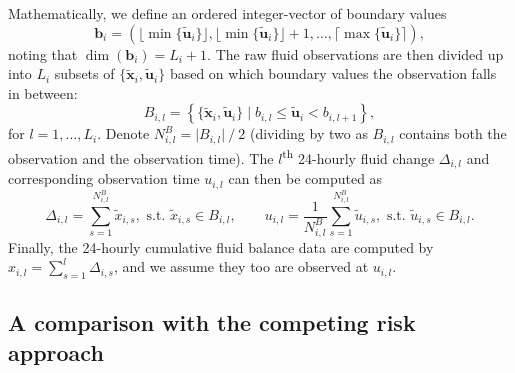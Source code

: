 \documentclass[
  10pt,
  a4paper,
]{article}
\begin{document}
Mathematically, we define an ordered integer-vector of boundary values
\begin{equation}
  \boldsymbol{b}_{i} = (\lfloor \min\{\tilde{\boldsymbol{u}}_{i}\} \rfloor,  \lfloor \min\{\tilde{\boldsymbol{u}}_{i}\} \rfloor + 1, \ldots, \lceil \max\{\tilde{\boldsymbol{u}}_{i}\} \rceil),
\end{equation} noting that \(\dim(\boldsymbol{b}_{i}) = L_{i} + 1\). The
raw fluid observations are then divided up into \(L_{i}\) subsets of
\(\{\tilde{\boldsymbol{x}}_{i}, \tilde{\boldsymbol{u}}_{i}\}\) based on
which boundary values the observation falls in between: \begin{equation}
  B_{i, l} = \left\{
    \{\tilde{\boldsymbol{x}}_{i}, \tilde{\boldsymbol{u}}_{i}\}
    \mid
    b_{i, l} \leq \tilde{\boldsymbol{u}}_{i} < b_{i, l + 1}
  \right\},
\end{equation} for \(l = 1, \ldots, L_{i}\). Denote
\(N^{B}_{i, l} = \lvert B_{i, l} \rvert \mathop{/} 2\) (dividing by two
as \(B_{i, l}\) contains both the observation and the observation time).
The \(l\)\textsuperscript{th} 24-hourly fluid change \(\Delta_{i, l}\)
and corresponding observation time \(u_{i, l}\) can then be computed as
\begin{equation}
  \Delta_{i, l} = \sum_{s = 1}^{N^{B}_{i, l}} \tilde{x}_{i, s}, \,\, \text{s.t.} \,\, \tilde{x}_{i, s} \in B_{i, l}, \qquad
  u_{i, l} = \frac{1}{N^{B}_{i, l}} \sum_{s = 1}^{N^{B}_{i, l}} \tilde{u}_{i, s}, \,\, \text{s.t.} \,\, \tilde{u}_{i, s} \in B_{i, l}.
\end{equation} Finally, the 24-hourly cumulative fluid balance data are
computed by \(x_{i, l} = \sum_{s = 1}^{l} \Delta_{i, s}\), and we assume
they too are observed at \(u_{i, l}\).

\hypertarget{a-comparison-with-the-competing-risk-approach}{%
\subsection{A comparison with the competing risk
approach}\label{a-comparison-with-the-competing-risk-approach}}
\end{document}
